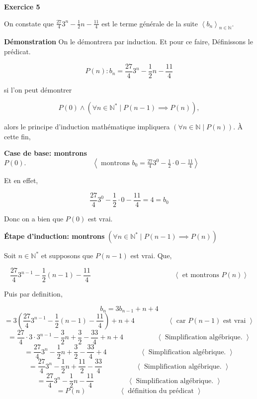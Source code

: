 \documentclass{article}
\newcommand{\tuple}[1]{\ensuremath{\left\langle #1 \right\rangle}}
\begin{document}
\textbf{Exercice 5}

\vspace{0.5cm}
On constate que $\frac{27}{4}3^n - \frac{1}{2}n - \frac{11}{4}$ est le terme générale de la suite $\tuple{b_n}_{n \in \mathbb{N}}$.

\vspace{0.5cm}

\textbf{Démonstration} On le démontrera par induction. Et pour ce faire, Définissons le prédicat.

$$P(n): b_n = \frac{27}{4}3^n - \frac{1}{2}n - \frac{11}{4} $$ 

si l'on peut démontrer 

$$P(0) \land (\forall n \in \mathbb{N}^{*} \mid P(n-1) \implies P(n)),$$

alors le principe d'induction mathématique impliquera $(\forall n \in \mathbb{N} \mid P(n))$. À cette fin,
\vspace{0.5cm}

\textbf{Case de base: montrons} $P(0). \hspace{4cm} \tuple{ \text{ montrons } b_0 = \frac{27}{4}3^0 - \frac{1}{2}\cdot 0 - \frac{11}{4}}$

Et en effet,

$$ \frac{27}{4}3^0 - \frac{1}{2}\cdot 0 - \frac{11}{4} = 4 = b_0$$

Donc on a bien que $P(0)$ est vrai.

\vspace{0.5cm}
\textbf{Étape d'induction: montrons} $(\forall n \in \mathbb{N}^{*} \mid P(n-1) \implies P(n))$

Soit $n \in \mathbb{N}^{*}$ et supposons que $P(n-1)$ est vrai. Que,

$$ \frac{27}{4}3^{n-1} - \frac{1}{2}(n-1) - \frac{11}{4} \hspace{5cm} \tuple{ \text{ et montrons } P(n)} $$

Puis par definition, 

$$ b_n = 3b_{n-1} + n + 4 $$
$$ = 3(\frac{27}{4}3^{n-1} - \frac{1}{2}(n-1) - \frac{11}{4})+ n + 4 \hspace{2cm} \tuple{ \text{ car } P(n-1) \text{ est vrai }}$$
$$ = \frac{27}{4}\cdot3\cdot3^{n-1} - \frac{3}{2}n + \frac{3}{2} - \frac{33}{4} + n + 4 \hspace{2cm} \tuple{ \text{ Simplification algébrique. } }$$
$$ = \frac{27}{4}3^n - \frac{1}{2}n + \frac{3}{2} - \frac{33}{4} + 4 \hspace{2cm} \tuple{ \text{ Simplification algébrique. } }$$
$$ = \frac{27}{4}3^n - \frac{1}{2}n + \frac{11}{2} - \frac{33}{4} \hspace{2cm} \tuple{ \text{ Simplification algébrique. } }$$
$$ = \frac{27}{4}3^n - \frac{1}{2}n - \frac{11}{4} \hspace{2cm} \tuple{ \text{ Simplification algébrique. } }$$
$$ = P(n) \hspace{2cm} \tuple{ \text{ définition du prédicat } }$$
\end{document}
